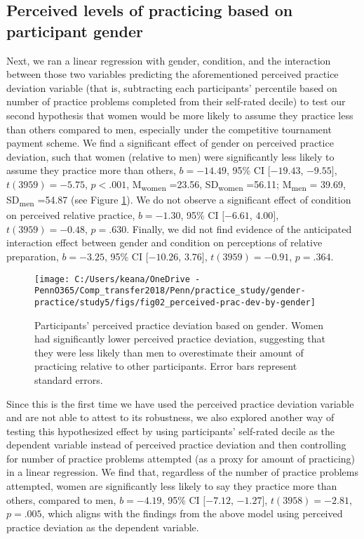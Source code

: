 \documentclass[letterpaper, nobind]{templates/ociamthesis}
\begin{document}
\hypertarget{perceived-levels-of-practicing-based-on-participant-gender}{%
\subsection{Perceived levels of practicing based on participant gender}\label{perceived-levels-of-practicing-based-on-participant-gender}}

Next, we ran a linear regression with gender, condition, and the interaction between those two variables predicting the aforementioned perceived practice deviation variable (that is, subtracting each participants' percentile based on number of practice problems completed from their self-rated decile) to test our second hypothesis that women would be more likely to assume they practice less than others compared to men, especially under the competitive tournament payment scheme. We find a significant effect of gender on perceived practice deviation, such that women (relative to men) were significantly less likely to assume they practice more than others, \(b = -14.49\), 95\% CI \([-19.43\), \(-9.55]\), \(t(3959) = -5.75\), \(p < .001\), M\textsubscript{women} =23.56, SD\textsubscript{women} =56.11; M\textsubscript{men} = 39.69, SD\textsubscript{men} =54.87 (see Figure \ref{fig:s410}). We do not observe a significant effect of condition on perceived relative practice, \(b = -1.30\), 95\% CI \([-6.61\), \(4.00]\), \(t(3959) = -0.48\), \(p = .630\). Finally, we did not find evidence of the anticipated interaction effect between gender and condition on perceptions of relative preparation, \(b = -3.25\), 95\% CI \([-10.26\), \(3.76]\), \(t(3959) = -0.91\), \(p = .364\).

\begin{figure}

{\centering \texttt{[image: C:/Users/keana/OneDrive - PennO365/Comp\_transfer2018/Penn/practice\_study/gender-practice/study5/figs/fig02\_perceived-prac-dev-by-gender]} 

}

\caption{Participants' perceived practice deviation based on gender. Women had significantly lower perceived practice deviation, suggesting that they were less likely than men to overestimate their amount of practicing relative to other participants. Error bars represent standard errors.}\label{fig:s410}
\end{figure}

Since this is the first time we have used the perceived practice deviation variable and are not able to attest to its robustness, we also explored another way of testing this hypothesized effect by using participants' self-rated decile as the dependent variable instead of perceived practice deviation and then controlling for number of practice problems attempted (as a proxy for amount of practicing) in a linear regression. We find that, regardless of the number of practice problems attempted, women are significantly less likely to say they practice more than others, compared to men, \(b = -4.19\), 95\% CI \([-7.12\), \(-1.27]\), \(t(3958) = -2.81\), \(p = .005\), which aligns with the findings from the above model using perceived practice deviation as the dependent variable.
\end{document}
